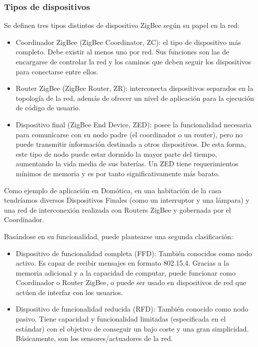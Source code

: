 \subsubsection{Tipos de dispositivos}
Se definen tres tipos distintos de dispositivo ZigBee seg\'un su papel en la red:

\begin{itemize}
\item Coordinador ZigBee (ZigBee Coordinator, ZC): el tipo de dispositivo m\'as completo. Debe existir al menos uno por
red. Sus funciones son las de encargarse de controlar la red y los caminos que deben seguir los dispositivos para
conectarse entre ellos.
\item Router ZigBee (ZigBee Router, ZR): interconecta dispositivos separados en la topolog\'ia de la red, adem\'as de
ofrecer un nivel de aplicaci\'on para la ejecuci\'on de c\'odigo de usuario.
\item Dispositivo final (ZigBee End Device, ZED): posee la funcionalidad necesaria para comunicarse con su nodo padre
(el coordinador o un router), pero no puede transmitir informaci\'on destinada a otros dispositivos. De esta forma, este
tipo de nodo puede estar dormido la mayor parte del tiempo, aumentando la vida media de sus bater\'ias. Un ZED tiene
requerimientos m\'inimos de memoria y es por tanto significativamente m\'as barato.
\end{itemize}
Como ejemplo de aplicaci\'on en Dom\'otica, en una habitaci\'on de la casa tendr\'iamos diversos Dispositivos Finales (como un
interruptor y una l\'ampara) y una red de interconexi\'on realizada con Routers ZigBee y gobernada por el Coordinador.

Bas\'andose en su funcionalidad, puede plantearse una segunda clasificaci\'on:

\begin{itemize}
\item Dispositivo de funcionalidad completa (FFD): Tambi\'en conocidos como nodo activo. Es capaz de recibir mensajes en
formato 802.15.4. Gracias a la memoria adicional y a la capacidad de computar, puede funcionar como Coordinador o
Router ZigBee, o puede ser usado en dispositivos de red que act\'uen de interfaz con los usuarios.
\item Dispositivo de funcionalidad reducida (RFD): Tambi\'en conocido como nodo pasivo. Tiene capacidad y funcionalidad
limitadas (especificada en el est\'andar) con el objetivo de conseguir un bajo coste y una gran simplicidad. B\'asicamente,
son los sensores/actuadores de la red.
\end{itemize}



